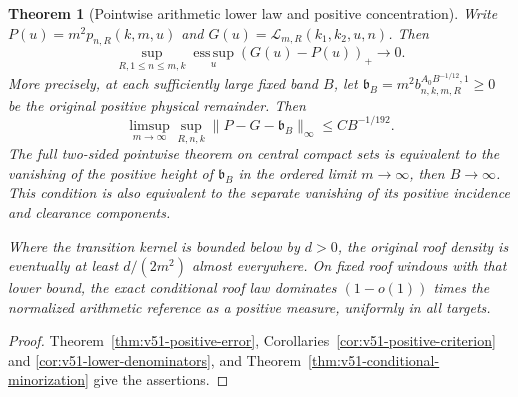 \documentclass[11pt,reqno]{amsart}
\numberwithin{equation}{section}
\newtheorem{leadtheorem}{Theorem}
\theoremstyle{definition}\newtheorem{definition}[theorem]{Definition}
\theoremstyle{remark}\newtheorem{remark}[theorem]{Remark}
\begin{document}
\begin{leadtheorem}[Pointwise arithmetic lower law and positive concentration]
\label{thm:intro-v51-lower}
Write $P(u)=m^2p_{n,R}(k,m,u)$ and
$G(u)=\mathcal L_{m,R}(k_1,k_2,u,n)$. Then
\[
 \sup_{R,1\le n\le m,k}\operatorname*{ess\,sup}_u(G(u)-P(u))_+
                                                       \longrightarrow0.
\]
More precisely, at each sufficiently large fixed band $B$, let
$\mathfrak b_B=m^2b^{A_0B^{-1/12},1}_{n,k,m,R}\ge0$ be the
original positive physical remainder. Then
\[
 \limsup_{m\to\infty}\sup_{R,n,k}
                  \|P-G-\mathfrak b_B\|_\infty\le CB^{-1/192}.
\]
The full two-sided pointwise theorem on central compact sets is
equivalent to the vanishing of the positive height of $\mathfrak b_B$
in the ordered limit $m\to\infty$, then $B\to\infty$.
This condition is also equivalent to the separate vanishing of its
positive incidence and clearance components.

Where the transition kernel is bounded below by $d>0$, the original
roof density is eventually at least $d/(2m^2)$ almost everywhere.
On fixed roof windows with that lower bound, the exact conditional
roof law dominates $(1-o(1))$ times the normalized arithmetic reference
as a positive measure, uniformly in all targets.
\end{leadtheorem}
\begin{proof}
Theorem~\ref{thm:v51-positive-error},
Corollaries~\ref{cor:v51-positive-criterion} and
\ref{cor:v51-lower-denominators}, and
Theorem~\ref{thm:v51-conditional-minorization} give the assertions.
\end{proof}
\end{document}
